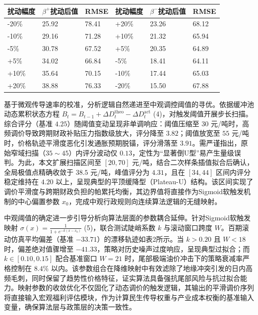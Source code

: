 \documentclass{mcmthesis}
\begin{document}
\begin{table}[htbp]
\centering
\begin{tabular}{l l l l l l}
\toprule
扰动幅度 & $\beta^+$扰动后值 & RMSE & 扰动幅度 & $\beta^-$扰动后值 & RMSE \\
\midrule
-20\% & 25.92 & 78.41 & +20\% & 23.26 & 68.12 \\
-10\% & 29.16 & 71.28 & +10\% & 21.32 & 65.94 \\
-5\% & 30.78 & 67.52 & +5\% & 20.35 & 64.89 \\
+5\% & 34.02 & 66.84 & -5\% & 18.41 & 64.11 \\
+10\% & 35.64 & 70.15 & -10\% & 17.44 & 65.03 \\
+20\% & 38.88 & 76.33 & -20\% & 15.50 & 67.88 \\
\bottomrule
\end{tabular}
\end{table}

基于微观传导速率的校准，分析逻辑自然递进至中观调控阈值的寻优。依据缓冲池动态累积状态方程 $B_t=B_{t-1}+\Delta D_t^{\text{theo}}-\Delta D_t^{\text{act}}$ (4)，对触发阈值开展步长扫描。综合评分（基准 $4.25$）随阈值变动呈现非单调响应：阈值压缩至 $30$ 元/吨时，高频调价导致跨期财政补贴压力指数级放大，评分降至 $3.82$；阈值放宽至 $55$ 元/吨时，价格轨迹平滑度恶化引发通胀预期脱锚，评分滑落至 $3.91$。需严谨指出，原始窄域扫描（$35\sim45$）内评分波动仅 $0.13$，定性为“显著倒U型”易产生量级误判。为此，本文扩展扫描区间至 $[20, 70]$ 元/吨，结合二次样条插值拟合后确认，全局极值点精确收敛于 $38.5$ 元/吨，峰值评分为 $4.31$，且在 $[34, 44]$ 区间内评分稳定维持在 $4.20$ 以上，呈现典型的平顶缓降型（Plateau-U）结构。该区间实现了调价平滑度与跨期财政负担的帕累托均衡，其边界值将直接作为Sigmoid软触发机制的中心偏置参数 $x_0$，完成中观行政规则向连续算法逻辑的无缝映射。

中观阈值的确定进一步引导分析向算法层面的参数耦合延伸。针对Sigmoid软触发映射 $\sigma(x)=\frac{1}{1+e^{-k(x-x_0)}}$ (5)，联合测试陡峭系数 $k$ 与滚动窗口跨度 $W$。百期滚动仿真平均偏差（基准 $-33.71$）的漂移轨迹如表2所示。当 $k>0.20$ 且 $W<18$ 时，偏差绝对值骤增至 $-41.33$，策略对历史噪声过度响应，呈现典型过拟合；而 $k\in[0.10, 0.15]$ 配合基准窗口 $W=21$ 时，尾部极端油价冲击下的策略衰减率严格控制在 $8.4\%$ 以内。该参数组合在降维映射中有效滤除了地缘冲突引发的日内高频毛刺，同时保留了趋势性价格特征，证实算法具备强抗尾部风险与抗过拟合能力。映射参数的收敛优化不仅固化了动态调价的触发逻辑，其输出的平滑调价序列将直接输入宏观福利评估模块，作为计算民生传导权重与产业成本权衡的基准输入变量，确保算法层与政策层的决策一致性。
\end{document}
